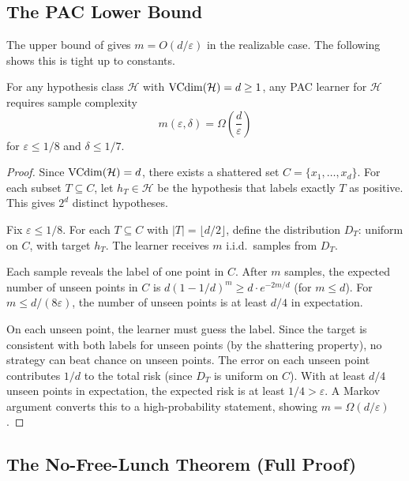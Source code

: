 \subsection{The PAC Lower Bound}
\label{sec:pac-lower}

The upper bound of  gives $m = O(d/\varepsilon)$ in the
realizable case.  The following shows this is tight up to constants.

\begin{thm}
\label{thm:pac-lower}
For any hypothesis class $\mathcal{H}$ with $\mathrm{VCdim}(\mathcal{H}) = d \geq 1$, any
PAC learner for $\mathcal{H}$ requires sample complexity
\[
  m(\varepsilon, \delta) = \Omega\!\left(\frac{d}{\varepsilon}\right)
\]
for $\varepsilon \leq 1/8$ and $\delta \leq 1/7$.
\end{thm}

\begin{proof}
Since $\mathrm{VCdim}(\mathcal{H}) = d$, there exists a shattered set
$C = \{x_1, \ldots, x_d\}$.  For each subset $T \subseteq C$, let
$h_T \in \mathcal{H}$ be the hypothesis that labels exactly $T$ as positive.
This gives $2^d$ distinct hypotheses.

Fix $\varepsilon \leq 1/8$.  For each $T \subseteq C$ with $|T| =
\lfloor d/2 \rfloor$, define the distribution $D_T$: uniform on $C$, with
target $h_T$.  The learner receives $m$ i.i.d.\ samples from $D_T$.

Each sample reveals the label of one point in $C$.  After $m$ samples, the
expected number of unseen points in $C$ is $d(1 - 1/d)^m \geq d \cdot
e^{-2m/d}$ (for $m \leq d$).  For $m \leq d/(8\varepsilon)$, the number of
unseen points is at least $d/4$ in expectation.

On each unseen point, the learner must guess the label.  Since the target is
consistent with both labels for unseen points (by the shattering property),
no strategy can beat chance on unseen points.  The error on each unseen point
contributes $1/d$ to the total risk (since $D_T$ is uniform on $C$).  With
at least $d/4$ unseen points in expectation, the expected risk is at least
$1/4 > \varepsilon$.  A Markov argument converts this to a high-probability
statement, showing $m = \Omega(d/\varepsilon)$.
\end{proof}


\subsection{The No-Free-Lunch Theorem (Full Proof)}
\label{sec:nfl-full}

